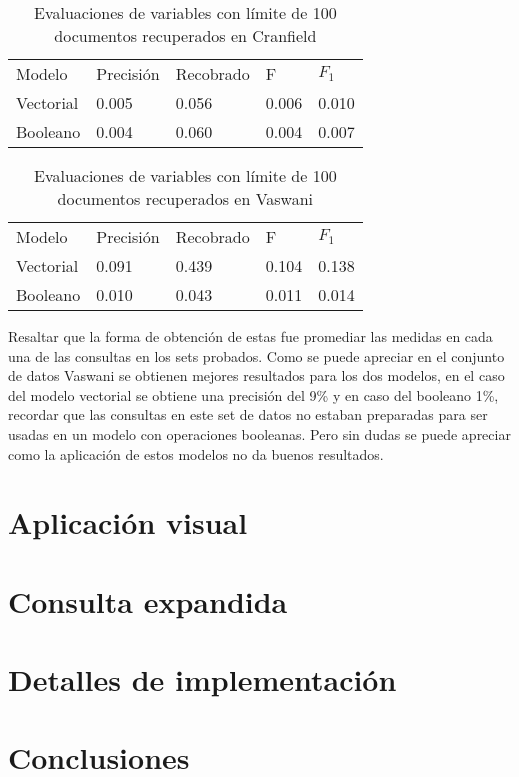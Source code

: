 \documentclass{llncs}
\begin{document}
\begin{table}
    \begin{center}
        \caption{Evaluaciones de variables con límite de 100 documentos recuperados en Cranfield}
        \begin{tabular}{lllll}
            \hline\noalign{\smallskip}
            Modelo    & Precisión & Recobrado & F     & $F_1$ \\
            \noalign{\smallskip}
            \hline
            \noalign{\smallskip}
            Vectorial & 0.005     & 0.056     & 0.006 & 0.010 \\
            Booleano  & 0.004     & 0.060     & 0.004 & 0.007 \\
            \hline
        \end{tabular}
    \end{center}
\end{table}

\begin{table}
    \begin{center}
        \caption{Evaluaciones de variables con límite de 100 documentos recuperados en Vaswani}
        \begin{tabular}{lllll}
            \hline\noalign{\smallskip}
            Modelo    & Precisión & Recobrado & F     & $F_1$ \\
            \noalign{\smallskip}
            \hline
            \noalign{\smallskip}
            Vectorial & 0.091     & 0.439     & 0.104 & 0.138 \\
            Booleano  & 0.010     & 0.043     & 0.011 & 0.014 \\
            \hline
        \end{tabular}
    \end{center}
\end{table}

Resaltar que la forma de obtención de estas fue promediar las medidas en cada una de las consultas en los sets probados. Como se puede apreciar en el conjunto de datos Vaswani se obtienen mejores resultados para los dos modelos, en el caso del modelo vectorial se obtiene una precisión del 9\% y en caso del booleano 1\%, recordar que las consultas en este set de datos no estaban preparadas para ser usadas en un modelo con operaciones booleanas. Pero sin dudas se puede apreciar como la aplicación de estos modelos no da buenos resultados.

\section{Aplicación visual}

\section{Consulta expandida}

\section{Detalles de implementación}

\section{Conclusiones}
\end{document}
